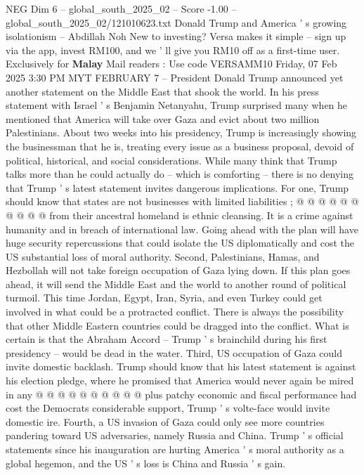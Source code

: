 \begin{textsample}{NEG Dim 6 – global\_south\_2025\_02 – Score -1.00 – global\_south\_2025\_02/121010623.txt}  \label{ex:f6_neg_042}
Donald Trump and America ' s growing isolationism -- Abdillah Noh New to investing?
Versa makes it simple -- sign up via the app, invest RM100, and we ' ll give you RM10 off as a first-time user.
Exclusively for \textbf{Malay} Mail readers : Use code VERSAMM10 Friday, 07 Feb 2025 3:30 PM MYT FEBRUARY 7 -- President Donald Trump announced yet another statement on the Middle East that shook the world.
In his press statement with Israel ' s Benjamin Netanyahu, Trump surprised many when he mentioned that America will take over Gaza and evict about two million Palestinians.
About two weeks into his presidency, Trump is increasingly showing the businessman that he is, treating every issue as a business proposal, devoid of political, historical, and social considerations.
While many think that Trump talks more than he could actually do -- which is comforting -- there is no denying that Trump ' s latest statement invites dangerous implications.
For one, Trump should know that states are not businesses with limited liabilities ; @ @ @ @ @ @ @ @ @ @ from their ancestral homeland is ethnic cleansing.
It is a crime against humanity and in breach of international law.
Going ahead with the plan will have huge security repercussions that could isolate the US diplomatically and cost the US substantial loss of moral authority.
Second, Palestinians, Hamas, and Hezbollah will not take foreign occupation of Gaza lying down.
If this plan goes ahead, it will send the Middle East and the world to another round of political turmoil.
This time Jordan, Egypt, Iran, Syria, and even Turkey could get involved in what could be a protracted conflict.
There is always the possibility that other Middle Eastern countries could be dragged into the conflict.
What is certain is that the Abraham Accord -- Trump ' s brainchild during his first presidency -- would be dead in the water.
Third, US occupation of Gaza could invite domestic backlash.
Trump should know that his latest statement is against his election pledge, where he promised that America would never again be mired in any @ @ @ @ @ @ @ @ @ @ plus patchy economic and fiscal performance had cost the Democrats considerable support, Trump ' s volte-face would invite domestic ire.
Fourth, a US invasion of Gaza could only see more countries pandering toward US adversaries, namely Russia and China.
Trump ' s official statements since his inauguration are hurting America ' s moral authority as a global hegemon, and the US ' s loss is China and Russia ' s gain.

\end{textsample}

